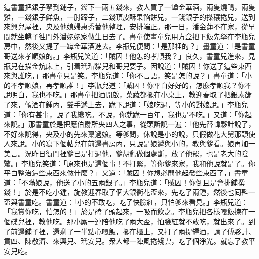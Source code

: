 這書童把銀子拏到鋪子，鎦下一兩五錢來，教人買了一罈金華酒，兩隻燒鴨，兩隻雞，一錢銀子鮮魚，一肘蹄子，二錢頂皮酥果餡餅兒，一錢銀子的搽穰捲兒，送到來興兒屋裡，央及他媳婦惠秀替他整理，安排端正。那一日，潘金蓮不在家，從早間就坐轎子徃門外潘姥姥家做生日去了。書童使畫童兒用方盒把下飯先拏在李瓶兒房中，然後又提了一罈金華酒進去。李瓶兒便問：「是那裡的？」畫童道：「是書童哥送來孝順娘的。」李瓶兒笑道：「賊囚！他怎的孝順我？」良久，書童兒進來，見瓶兒在描金炕床上，引着玳瑁貓兒和哥兒耍子。因說道：「賊囚！你送了這些東西來與誰吃，」那書童只是笑。李瓶兒道：「你不言語，笑是怎的說？」書童道：「小的不孝順娘，再孝順誰！」{}李瓶兒道：「賊囚！你平白好好的，怎麼孝順我？你不說明白，我也不吃。」那書童把酒開啟，菜蔬都擺在小桌上，教迎春取了把銀素篩了來，傾酒在鍾內，雙手遞上去，跪下說道：「娘吃過，等小的對娘說。」李瓶兒道：「你有甚事，說了我纔吃。不說，你就跪一百年，我也是不吃。」又道：「你起來說。」那書童於是把應伯爵所央四人之事，從頭訴說一遍：「他先替韓夥計說了，不好來說得，央及小的先來稟過娘。等爹問，休說是小的說，只假做花大舅那頭使人來說。小的寫下個帖兒在前邊書房內，只說是娘遞與小的，教與爹看。娘再加一美言。況昨日衙門裡爹已是打過他，爹胡亂做個處斷，放了他罷，也是老大的陰騭。」李瓶兒笑道：「原來也是這個事！不打緊，等你爹來家，我和他說就是了。你平白整治這些東西來做什麼？」又道：「賊囚！你想必問他起發些東西了，」書童道：「不瞞娘說，他送了小的五兩銀子。」李瓶兒道：「賊囚！你倒且是會排鋪撰錢！」於是不吃小鍾，旋教迎春取了個大銀衢花盃來，先吃了兩鍾，然後也囘斟一盃與書童吃。書童道：「小的不敢吃，吃了快臉紅，只怕爹來看見。」李瓶兒道：「我賞你吃，怕怎的！」於是磕了頭起來，一吸而飲之。李瓶兒把各樣嘎飯揀在一個碟兒裡，教他吃。那小厮一連陪他吃了兩大盃，怕臉紅就不敢吃，就出來了。到了前邊鋪子裡，還剩了一半點心嘎飯，擺在櫃上，又打了兩提罈酒，請了傅夥計、賁四、陳敬濟、來興兒、玳安兒。衆人都一陣風捲殘雲，吃了個淨光。就忘了教平安兒吃。

